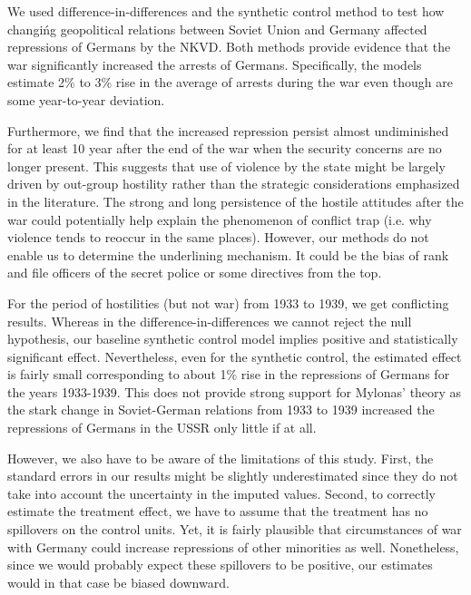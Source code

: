 We used difference-in-differences and the synthetic control method to test how changińg geopolitical relations between Soviet Union and Germany  affected repressions of Germans by the NKVD. 
Both methods provide evidence that the war significantly increased the arrests of Germans.
Specifically, the models estimate 2\% to 3\% rise in the average of arrests during the war even though are some year-to-year deviation. 

Furthermore, we find that the increased repression persist almost undiminished for at least 10 year after the end of the war when the security concerns are no longer present.
This  suggests that use of violence by the state might be largely driven by out-group 
hostility rather than the strategic considerations emphasized in the literature. 
The strong and long persistence of the hostile attitudes after the war could potentially help explain the phenomenon of conflict trap (i.e. why violence tends to reoccur in the same places). 
However, our methods do not enable us to determine the underlining mechanism. It could be the bias of  rank and file officers of the secret police or some  directives from the top. %

For the period of hostilities (but not war) from 1933 to 1939, we get conflicting results. Whereas in the difference-in-differences we cannot reject the null hypothesis, our baseline synthetic control model implies positive and statistically significant effect. Nevertheless, even for the synthetic control, the estimated effect is fairly small corresponding to about 1\% rise in the repressions of Germans for the years 1933-1939.
This does not provide strong support for Mylonas'  \citeyearpar{mylonas_politics_2013} theory as the stark change in Soviet-German relations from 1933 to 1939 increased the repressions of Germans in the USSR only little if at all. 

However, we also  have to be aware of the limitations of this study. 
First, the standard errors in our results might be slightly underestimated  since they do not take into account the uncertainty in the imputed values. 
Second, to correctly estimate the treatment effect, we have to assume that the treatment has no spillovers on the control units. Yet, it is fairly plausible that circumstances of war with Germany could increase repressions of other minorities as well.
Nonetheless, since we would probably expect these spillovers  to be positive, our estimates would in that case be biased downward.

